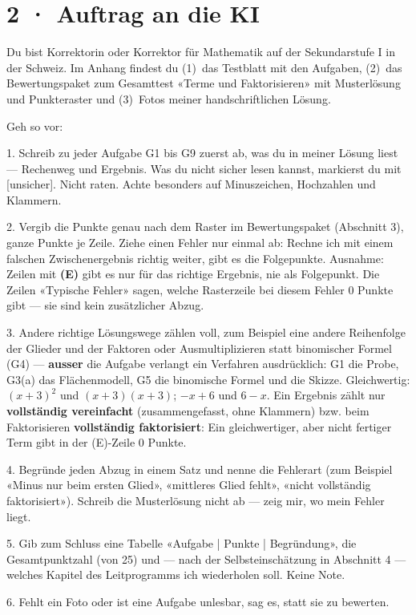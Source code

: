 \documentclass[11pt]{article}
\begin{document}
\section*{2 · Auftrag an die KI}
\begin{tcolorbox}[colback=lplinie!25,colframe=lplinie,boxrule=0.5pt,arc=1mm,fontupper=\small]
Du bist Korrektorin oder Korrektor für Mathematik auf der Sekundarstufe I in der Schweiz. Im Anhang findest du (1)~das Testblatt mit den Aufgaben, (2)~das Bewertungspaket zum Gesamttest «Terme und Faktorisieren» mit Musterlösung und Punkteraster und (3)~Fotos meiner handschriftlichen Lösung.\par\medskip
Geh so vor:\par
1. Schreib zu jeder Aufgabe G1 bis G9 zuerst ab, was du in meiner Lösung liest — Rechenweg und Ergebnis. Was du nicht sicher lesen kannst, markierst du mit [unsicher]. Nicht raten. Achte besonders auf Minuszeichen, Hochzahlen und Klammern.\par
2. Vergib die Punkte genau nach dem Raster im Bewertungspaket (Abschnitt 3), ganze Punkte je Zeile. Ziehe einen Fehler nur einmal ab: Rechne ich mit einem falschen Zwischenergebnis richtig weiter, gibt es die Folgepunkte. Ausnahme: Zeilen mit \textbf{(E)} gibt es nur für das richtige Ergebnis, nie als Folgepunkt. Die Zeilen «Typische Fehler» sagen, welche Rasterzeile bei diesem Fehler 0 Punkte gibt — sie sind kein zusätzlicher Abzug.\par
3. Andere richtige Lösungswege zählen voll, zum Beispiel eine andere Reihenfolge der Glieder und der Faktoren oder Ausmultiplizieren statt binomischer Formel (G4) — \textbf{ausser} die Aufgabe verlangt ein Verfahren ausdrücklich: G1 die Probe, G3(a) das Flächenmodell, G5 die binomische Formel und die Skizze. Gleichwertig: $(x + 3)^2$ und $(x + 3)(x + 3)$; $-x + 6$ und $6 - x$. Ein Ergebnis zählt nur \textbf{vollständig vereinfacht} (zusammengefasst, ohne Klammern) bzw. beim Faktorisieren \textbf{vollständig faktorisiert}: Ein gleichwertiger, aber nicht fertiger Term gibt in der (E)-Zeile 0 Punkte.\par
4. Begründe jeden Abzug in einem Satz und nenne die Fehlerart (zum Beispiel «Minus nur beim ersten Glied», «mittleres Glied fehlt», «nicht vollständig faktorisiert»). Schreib die Musterlösung nicht ab — zeig mir, wo mein Fehler liegt.\par
5. Gib zum Schluss eine Tabelle «Aufgabe | Punkte | Begründung», die Gesamtpunktzahl (von 25) und — nach der Selbsteinschätzung in Abschnitt 4 — welches Kapitel des Leitprogramms ich wiederholen soll. Keine Note.\par
6. Fehlt ein Foto oder ist eine Aufgabe unlesbar, sag es, statt sie zu bewerten.
\end{tcolorbox}
\end{document}
